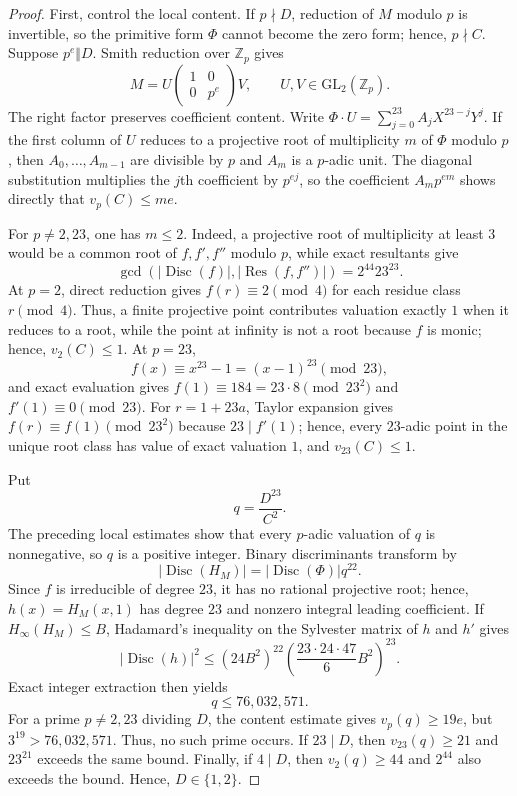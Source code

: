 \documentclass[11pt]{article}
\begin{document}
\begin{proof}
First, control the local content.  If $p\nmid D$, reduction of $M$ modulo $p$ is invertible, so the primitive form $\Phi$ cannot become the zero form; hence, $p\nmid C$.  Suppose $p^e\Vert D$.  Smith reduction over $\mathbb Z_p$ gives
\[
 M=U\begin{pmatrix}1&0\\0&p^e\end{pmatrix}V,
 \qquad U,V\in\mathrm{GL}_2(\mathbb Z_p).
\]
The right factor preserves coefficient content.  Write $\Phi\mathbin{\cdot}U=\sum_{j=0}^{23}A_jX^{23-j}Y^j$.  If the first column of $U$ reduces to a projective root of multiplicity $m$ of $\Phi$ modulo $p$, then $A_0,\ldots,A_{m-1}$ are divisible by $p$ and $A_m$ is a $p$-adic unit.  The diagonal substitution multiplies the $j$th coefficient by $p^{ej}$, so the coefficient $A_mp^{em}$ shows directly that $v_p(C)\le me$.

For $p\ne2,23$, one has $m\le2$.  Indeed, a projective root of multiplicity at least $3$ would be a common root of $f,f',f''$ modulo $p$, while exact resultants give
\[
 \gcd\!\left(|\operatorname{Disc}(f)|,|\operatorname{Res}(f,f'')|\right)
 =2^{44}23^{23}.
\]
At $p=2$, direct reduction gives $f(r)\equiv2\pmod4$ for each residue class $r\pmod4$.  Thus, a finite projective point contributes valuation exactly $1$ when it reduces to a root, while the point at infinity is not a root because $f$ is monic; hence, $v_2(C)\le1$.  At $p=23$,
\[
 f(x)\equiv x^{23}-1=(x-1)^{23}\pmod{23},
\]
and exact evaluation gives $f(1)\equiv184=23\cdot8\pmod{23^2}$ and $f'(1)\equiv0\pmod{23}$.  For $r=1+23a$, Taylor expansion gives $f(r)\equiv f(1)\pmod{23^2}$ because $23\mid f'(1)$; hence, every $23$-adic point in the unique root class has value of exact valuation $1$, and $v_{23}(C)\le1$.

Put
\[
 q=\frac{D^{23}}{C^2}.
\]
The preceding local estimates show that every $p$-adic valuation of $q$ is nonnegative, so $q$ is a positive integer.  Binary discriminants transform by
\[
 |\operatorname{Disc}(H_M)|
 =|\operatorname{Disc}(\Phi)|q^{22}.
\]
Since $f$ is irreducible of degree $23$, it has no rational projective root; hence, $h(x)=H_M(x,1)$ has degree $23$ and nonzero integral leading coefficient.  If $H_\infty(H_M)\le B$, Hadamard's inequality on the Sylvester matrix of $h$ and $h'$ gives
\[
 |\operatorname{Disc}(h)|^2
 \le (24B^2)^{22}
 \left(\frac{23\cdot24\cdot47}{6}B^2\right)^{23}.
\]
Exact integer extraction then yields
\[
 q\le76{,}032{,}571.
\]
For a prime $p\ne2,23$ dividing $D$, the content estimate gives $v_p(q)\ge19e$, but $3^{19}>76{,}032{,}571$.  Thus, no such prime occurs.  If $23\mid D$, then $v_{23}(q)\ge21$ and $23^{21}$ exceeds the same bound.  Finally, if $4\mid D$, then $v_2(q)\ge44$ and $2^{44}$ also exceeds the bound.  Hence, $D\in\{1,2\}$.
\end{proof}
\end{document}
